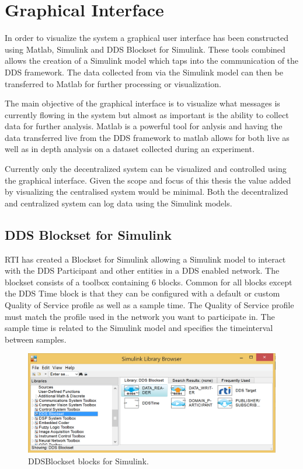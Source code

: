 \section{Graphical Interface} \label{sec:graphicalInterface}
In order to visualize the system a graphical user interface has been constructed using Matlab, Simulink and DDS Blockset for Simulink.
These tools combined allows the creation of a Simulink model which taps into the communication of the DDS framework.
The data collected from via the Simulink model can then be transferred to Matlab for further processing or visualization.

The main objective of the graphical interface is to visualize what messages is currently flowing in the system but almost as important is the ability to collect data for further analysis.
Matlab is a powerful tool for anlysis and having the data transferred live from the DDS framework to matlab allows for both live as well as in depth analysis on a dataset collected during an experiment.

Currently only the decentralized system can be visualized and controlled using the graphical interface. Given the scope and focus of this thesis the value added by visualizing the centralised system would be minimal. Both the decentralized and centralized system can log data using the Simulink models.

\subsection{DDS Blockset for Simulink}
RTI has created a Blockset for Simulink allowing a Simulink model to interact with the DDS Participant and other entities in a DDS enabled network.
The blockset consists of a toolbox containing 6 blocks. Common for all blocks except the DDS Time block is that they can be configured with a default or custom Quality of Service profile as well as a sample time. The Quality of Service profile must match the profile used in the network you want to participate in. The sample time is related to the Simulink model and specifies the timeinterval between samples.

\begin{figure}[h]
\includegraphics[width=\textwidth]{figures/DDSBlockset}
	\caption[DDSBlockset blocks for Simulink]{
		\label{fig:DDSBlocksetBlocks} 
		\footnotesize{%
			DDSBlockset blocks for Simulink.
		}
	}
\end{figure}


